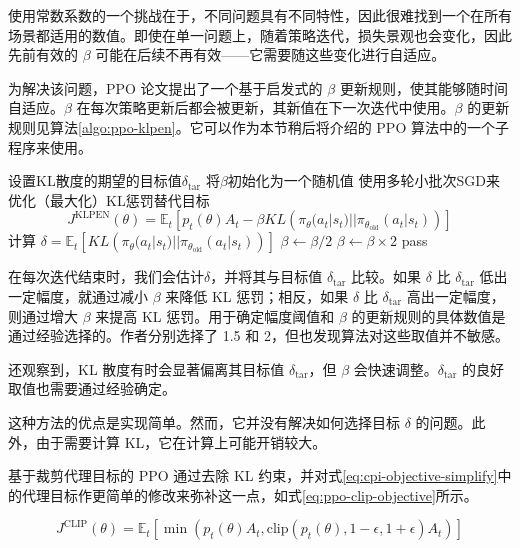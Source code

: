 \documentclass[lang=cn,newtx,10pt,scheme=chinese]{elegantbook}
\begin{document}
使用常数系数的一个挑战在于，不同问题具有不同特性，因此很难找到一个在所有场景都适用的数值。即使在单一问题上，随着策略迭代，损失景观也会变化，因此先前有效的 $\beta$ 可能在后续不再有效——它需要随这些变化进行自适应。

为解决该问题，PPO 论文提出了一个基于启发式的 $\beta$ 更新规则，使其能够随时间自适应。$\beta$ 在每次策略更新后都会被更新，其新值在下一次迭代中使用。$\beta$ 的更新规则见算法\ref{algo:ppo-klpen}。它可以作为本节稍后将介绍的 PPO 算法中的一个子程序来使用。

\begin{algorithm}
\caption{带自适应KL惩罚的PPO}\label{algo:ppo-klpen}
\begin{algorithmic}[1]
\State 设置KL散度的期望的目标值$\delta_\text{tar}$
\State 将$\beta$初始化为一个随机值
\State 使用多轮小批次SGD来优化（最大化）KL惩罚替代目标
$$
J^{\text{KLPEN}}(\theta) = \mathbb{E}_t\left[ p_t(\theta)A_t - \beta KL\left(\pi_\theta(a_t|s_t)||\pi_{\theta_\text{old}}(a_t|s_t)\right) \right]
$$
\State 计算 $\delta=\mathbb{E}_t\left[ KL\left(\pi_\theta(a_t|s_t)||\pi_{\theta_\text{old}}(a_t|s_t)\right) \right]$
\State $\beta\leftarrow\beta/2$
\State $\beta\leftarrow\beta\times 2$
\Else
\State pass
\EndIf
\end{algorithmic}
\end{algorithm}

在每次迭代结束时，我们会估计$\delta$，并将其与目标值 $\delta_\text{tar}$ 比较。如果 $\delta$ 比 $\delta_\text{tar}$ 低出一定幅度，就通过减小 $\beta$ 来降低 KL 惩罚；相反，如果 $\delta$ 比 $\delta_\text{tar}$ 高出一定幅度，则通过增大 $\beta$ 来提高 KL 惩罚。用于确定幅度阈值和 $\beta$ 的更新规则的具体数值是通过经验选择的。作者分别选择了 1.5 和 2，但也发现算法对这些取值并不敏感。

还观察到，KL 散度有时会显著偏离其目标值 $\delta_\text{tar}$，但 $\beta$ 会快速调整。$\delta_\text{tar}$ 的良好取值也需要通过经验确定。

这种方法的优点是实现简单。然而，它并没有解决如何选择目标 $\delta$ 的问题。此外，由于需要计算 KL，它在计算上可能开销较大。

基于裁剪代理目标的 PPO 通过去除 KL 约束，并对式\ref{eq:cpi-objective-simplify}中的代理目标作更简单的修改来弥补这一点，如式\ref{eq:ppo-clip-objective}所示。

\begin{equation}\label{eq:ppo-clip-objective}
J^{\text{CLIP}}(\theta) = \mathbb{E}_t\left[ \min\left( p_t(\theta)A_t, \text{clip}\left( p_t(\theta), 1-\epsilon, 1+\epsilon \right)A_t \right) \right]
\end{equation}
\end{document}
